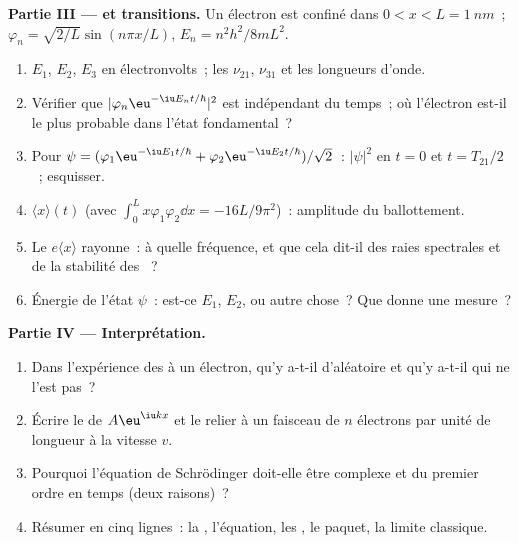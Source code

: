 \begin{problem}
\textbf{Partie III ---  et transitions.}
Un électron est confiné dans $0 < x < L = \qty{1}{nm}$~; $\varphi_n =
\sqrt{2/L}\sin(n\pi x/L)$, $E_n = n^2h^2/8mL^2$.
\begin{enumerate}[resume]
  \item $E_1$, $E_2$, $E_3$ en électronvolts~; les 
        $\nu_{21}$, $\nu_{31}$ et les longueurs d'onde.
  \item Vérifier que $|\varphi_n\eu^{-\iu E_nt/\hbar}|^2$ est indépendant du temps~;
        où l'électron est-il le plus probable dans l'état fondamental~?
  \item Pour $\psi = (\varphi_1\eu^{-\iu E_1t/\hbar} + \varphi_2\eu^{-\iu E_2t/\hbar})/
        \sqrt2$~: $|\psi|^2$ en $t = 0$ et $t = T_{21}/2$~; esquisser.
  \item $\langle x\rangle(t)$ (avec $\int_0^Lx\varphi_1\varphi_2\dd x = -16L/9\pi^2$)~:
        amplitude du ballottement.
  \item Le  $e\langle x\rangle$ rayonne~: à quelle
        fréquence, et que cela dit-il des raies spectrales et
        de la stabilité des ~?
  \item Énergie de l'état $\psi$~: est-ce $E_1$, $E_2$, ou autre
        chose~? Que donne une mesure~?
\end{enumerate}

\textbf{Partie IV --- Interprétation.}
\begin{enumerate}[resume]
  \item Dans l'expérience des  à un électron, qu'y a-t-il d'aléatoire
        et qu'y a-t-il qui ne l'est pas~?
  \item Écrire le  de $A\eu^{\iu kx}$ et le relier à
        un faisceau de $n$ électrons par unité de longueur à la vitesse $v$.
  \item Pourquoi l'équation de Schrödinger doit-elle être complexe et du premier ordre
        en temps (deux raisons)~?
  \item Résumer en cinq lignes~: la , l'équation, les
        , le paquet, la limite classique.
\end{enumerate}
\end{problem}
